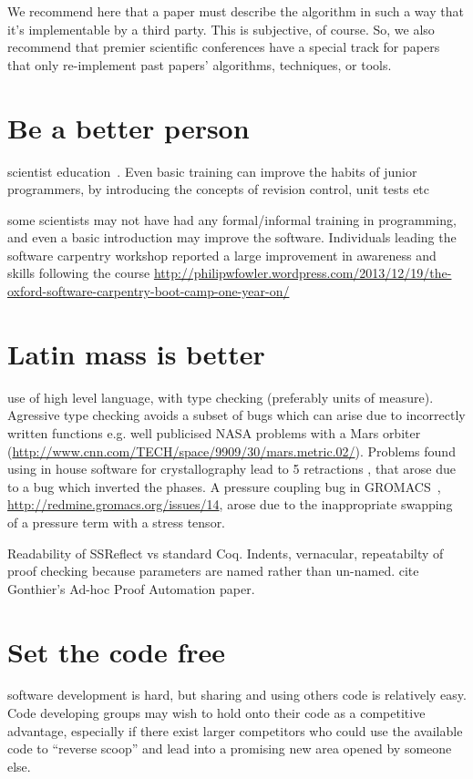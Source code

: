 \documentclass[conference]{IEEEtran}
\begin{document}
We recommend here that a paper must describe the algorithm in such a
way that it's implementable by a third party. This is subjective, of
course. So, we also recommend that premier scientific conferences have
a special track for papers that only re-implement past papers'
algorithms, techniques, or tools.



\section{Be a better person}

scientist education~\cite{Wilson2014}. Even basic training can improve
the habits of junior programmers, by introducing the concepts of
revision control, unit tests etc

some scientists may not have had any formal/informal training in programming, and even a basic introduction may improve the software. Individuals leading the software carpentry workshop reported a large improvement in awareness and skills following the course \url{http://philipwfowler.wordpress.com/2013/12/19/the-oxford-software-carpentry-boot-camp-one-year-on/}


\section{Latin mass is better}

use of high level language, with type checking (preferably units of
measure). Agressive type checking avoids a subset of bugs which can
arise due to incorrectly written functions e.g. well publicised NASA
problems with a Mars orbiter
(\url{http://www.cnn.com/TECH/space/9909/30/mars.metric.02/}). Problems
found using in house software for crystallography lead to 5
retractions \cite{Miller2006}, that arose due to a bug which inverted
the phases. A pressure coupling bug in GROMACS~\cite{Hess2008},
\url{http://redmine.gromacs.org/issues/14}, arose due to the
inappropriate swapping of a pressure term with a stress tensor.

Readability of SSReflect vs standard Coq. Indents, vernacular, repeatabilty of proof checking because parameters are named rather than un-named. 
cite Gonthier's Ad-hoc Proof Automation paper. 

\section{Set the code free} 

software development is hard, but sharing and using others code is
relatively easy. Code developing groups may wish to hold onto their
code as a competitive advantage, especially if there exist larger
competitors who could use the available code to ``reverse scoop'' and
lead into a promising new area opened by someone else.
\end{document}
